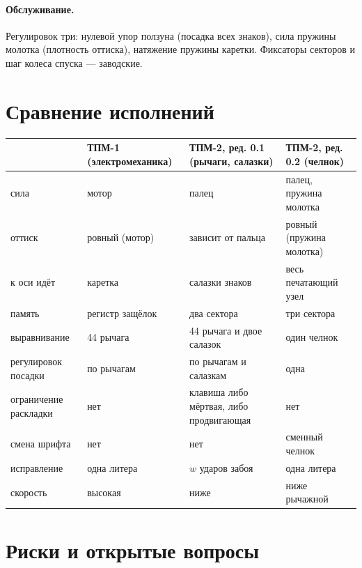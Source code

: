 \paragraph{Обслуживание.} Регулировок три: нулевой упор ползуна (посадка всех знаков), сила пружины молотка (плотность оттиска), натяжение пружины каретки. Фиксаторы секторов и шаг колеса спуска — заводские.

\section{Сравнение исполнений}

\begin{center}\small
\begin{tabularx}{\linewidth}{@{}>{\raggedright}p{32mm}>{\raggedright}X>{\raggedright}X>{\raggedright\arraybackslash}X@{}}
\toprule
& ТПМ-1 (электромеханика) & ТПМ-2, ред. 0.1 (рычаги, салазки) & ТПМ-2, ред. 0.2 (челнок) \\
\midrule
сила & мотор & палец & палец, пружина молотка \\
оттиск & ровный (мотор) & зависит от пальца & ровный (пружина молотка) \\
к оси идёт & каретка & салазки знаков & весь печатающий узел \\
память & регистр защёлок & два сектора & три сектора \\
выравнивание & 44 рычага & 44 рычага и двое салазок & один челнок \\
регулировок посадки & по рычагам & по рычагам и салазкам & одна \\
ограничение раскладки & нет & клавиша либо мёртвая, либо продвигающая & нет \\
смена шрифта & нет & нет & сменный челнок \\
исправление & одна литера & $w$ ударов забоя & одна литера \\
скорость & высокая & ниже & ниже рычажной \\
\bottomrule
\end{tabularx}
\end{center}

\section{Риски и открытые вопросы}

